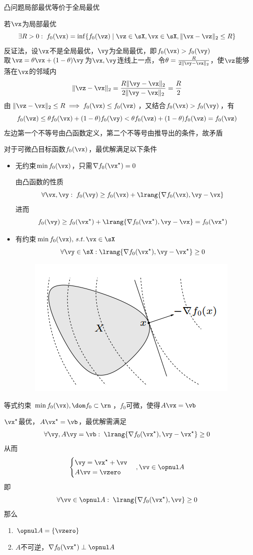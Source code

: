 \begin{theorem}
凸问题局部最优等价于全局最优
\end{theorem}
\begin{analysis}
若$\vx$为局部最优
\[\exists R>0:\;f_0(\vx)=\inf\{f_0(\vz)\mid \vz\in\sX,\vx\in\sX,\|\vx-\vz\|_2\leq R\}\]
反证法，设$\vx$不是全局最优，$\vy$为全局最优，即$f_0(\vx)>f_0(\vy)$\\
取$\vz=\theta \vx+(1-\theta)\vy$为$\vx,\vy$连线上一点，令$\theta=\frac{R}{2\|\vy-\vx\|_2}$，使$\vz$能够落在$\vx$的邻域内
\[\|\vz-\vx\|_2=\frac{R\|\vy-\vx\|_2}{2\|\vy-\vx\|_2}=\frac{R}{2}\]
由$\|\vz-\vx\|_2\leq R\implies f_0(\vx)\leq f_0(\vz)$，又结合$f_0(\vx)>f_0(\vy)$，有
\[f_0(\vz)\leq\theta f_0(\vx)+(1-\theta)f_0(\vy)<\theta f_0(\vz)+(1-\theta)f_0(\vz)=f_0(\vz)\]
左边第一个不等号由凸函数定义，第二个不等号由推导出的条件，故矛盾
\end{analysis}

对于可微凸目标函数$f_0(\vx)$，最优解满足以下条件
\begin{itemize}
	\item 无约束$\min f_0(\vx)$，只需$\nabla f_0(\vx^\star)=0$
	\begin{analysis}
	由凸函数的性质
	\[\forall \vx,\vy:\;f_0(\vy)\geq f_0(\vx)+\lrang{\nabla f_0(\vx),\vy-\vx}\]
	进而
	\[f_0(\vy)\geq f_0(\vx^\star)+\lrang{\nabla f_0(\vx^\star),\vy-\vx}=f_0(\vx^\star)\]
	\end{analysis}
	\item 有约束$\min f_0(\vx),\,s.t.\,\vx\in\sX$
	\[\forall \vy\in \sX:\lrang{\nabla f_0(\vx^\star),\vy-\vx^\star}\geq 0\]
	\begin{figure}[H]
		\centering
		\includegraphics[width=0.4\linewidth]{fig/optimal_criterion_diff.PNG}
	\end{figure}
\end{itemize}

\begin{example}
等式约束 $\min f_0(\vx),\dom f_0\subset\rn$，$f_0$可微，使得$A\vx=\vb$
\end{example}
\begin{analysis}
$\vx^\star$最优，$A\vx^\star=\vb$，最优解需满足
\[\forall \vy, A\vy=\vb:\;\lrang{\nabla f_0(\vx^\star),\vy-\vx^\star}\geq 0\]
从而
\[\begin{cases} \vy=\vx^\star+\vv\\A\vv=\vzero\end{cases},\vv\in\opnul A\]
即
\[\forall \vv\in\opnul A:\;\lrang{\nabla f_0(\vx^\star),\vv}\geq 0\]
那么
\begin{enumerate}
	\item $\opnul A=\{\vzero\}$
	\item $A$不可逆，$\nabla f_0(\vx^\star)\perp\opnul A$
\end{enumerate}
\end{analysis}

